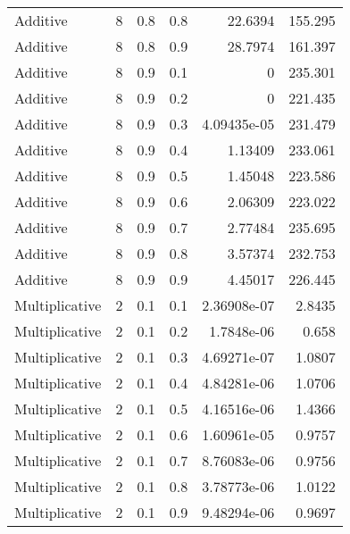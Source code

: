 \documentclass{article}
\begin{document}
\begin{longtable}[H]{lrrrrr}
 Additive       &       8 &   0.8 &            0.8 &     22.6394      &        155.295  \\
 Additive       &       8 &   0.8 &            0.9 &     28.7974      &        161.397  \\
 Additive       &       8 &   0.9 &            0.1 &      0           &        235.301  \\
 Additive       &       8 &   0.9 &            0.2 &      0           &        221.435  \\
 Additive       &       8 &   0.9 &            0.3 &      4.09435e-05 &        231.479  \\
 Additive       &       8 &   0.9 &            0.4 &      1.13409     &        233.061  \\
 Additive       &       8 &   0.9 &            0.5 &      1.45048     &        223.586  \\
 Additive       &       8 &   0.9 &            0.6 &      2.06309     &        223.022  \\
 Additive       &       8 &   0.9 &            0.7 &      2.77484     &        235.695  \\
 Additive       &       8 &   0.9 &            0.8 &      3.57374     &        232.753  \\
 Additive       &       8 &   0.9 &            0.9 &      4.45017     &        226.445  \\
 Multiplicative &       2 &   0.1 &            0.1 &      2.36908e-07 &          2.8435 \\
 Multiplicative &       2 &   0.1 &            0.2 &      1.7848e-06  &          0.658  \\
 Multiplicative &       2 &   0.1 &            0.3 &      4.69271e-07 &          1.0807 \\
 Multiplicative &       2 &   0.1 &            0.4 &      4.84281e-06 &          1.0706 \\
 Multiplicative &       2 &   0.1 &            0.5 &      4.16516e-06 &          1.4366 \\
 Multiplicative &       2 &   0.1 &            0.6 &      1.60961e-05 &          0.9757 \\
 Multiplicative &       2 &   0.1 &            0.7 &      8.76083e-06 &          0.9756 \\
 Multiplicative &       2 &   0.1 &            0.8 &      3.78773e-06 &          1.0122 \\
 Multiplicative &       2 &   0.1 &            0.9 &      9.48294e-06 &          0.9697 \\

\end{longtable}
\end{document}
